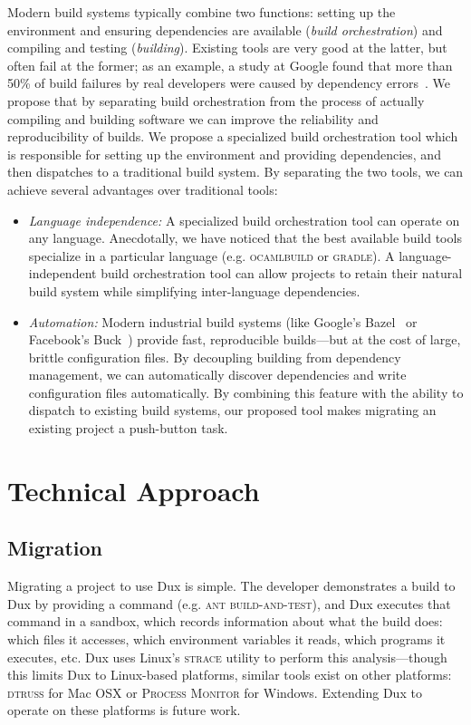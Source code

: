 \documentclass[10pt,conference]{IEEEtran}
\begin{document}
Modern build systems typically combine two functions:
setting up the environment and ensuring dependencies are available (\textit{build orchestration})
and compiling and testing (\textit{building}).
Existing tools are very good at the latter, but often fail at the former;
as an example, a study at Google found that more than 50\% of build failures
by real developers were caused by dependency errors~\cite{googlebuilderrors}.
We propose that by separating build orchestration from the process of actually
compiling and building software we can improve the reliability and reproducibility of builds.
We propose a specialized build orchestration tool which is responsible for setting up the environment
and providing dependencies, and then dispatches to a traditional build system.
By separating the two tools, we can achieve several advantages over traditional tools:
\begin{itemize}
\item{
\textit{Language independence:}
A specialized build orchestration tool can operate on any language.
Anecdotally, we have noticed that the best available build tools specialize
in a particular language (e.g. \textsc{ocamlbuild} or \textsc{gradle}).
A language-independent build orchestration tool can allow projects to retain
their natural build system while simplifying inter-language dependencies.
}
\item{
\textit{Automation:}
Modern industrial build systems (like Google's Bazel~\cite{blaze} or Facebook’s Buck~\cite{buck}) provide fast,
reproducible builds---but at the cost of large, brittle configuration files.
By decoupling building from dependency management, we can automatically
discover dependencies and write configuration files automatically.
By combining this feature with the ability to dispatch to existing build systems,
our proposed tool makes migrating an existing project a push-button task.
}
\end{itemize}

\section{Technical Approach}

\subsection{Migration}

Migrating a project to use Dux is simple.
The developer demonstrates a build to Dux by providing a command (e.g. \textsc{ant build-and-test}),
and Dux executes that command in a sandbox, which records information about what the build does:
which files it accesses, which environment variables it reads, which programs it executes, etc.
Dux uses Linux's \textsc{strace} utility to perform this analysis---though this limits Dux to
Linux-based platforms, similar tools exist on other platforms: \textsc{dtruss} for Mac OSX or
\textsc{Process Monitor} for Windows. Extending Dux to operate on these platforms is future work.
\end{document}
